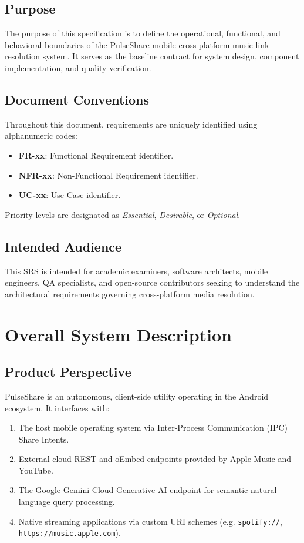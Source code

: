 \documentclass[12pt,a4paper]{report}
\begin{document}
\subsection{Purpose}
The purpose of this specification is to define the operational, functional, and behavioral boundaries of the PulseShare mobile cross-platform music link resolution system. It serves as the baseline contract for system design, component implementation, and quality verification.

\subsection{Document Conventions}
Throughout this document, requirements are uniquely identified using alphanumeric codes:
\begin{itemize}
    \item \textbf{FR-xx}: Functional Requirement identifier.
    \item \textbf{NFR-xx}: Non-Functional Requirement identifier.
    \item \textbf{UC-xx}: Use Case identifier.
\end{itemize}
Priority levels are designated as \textit{Essential}, \textit{Desirable}, or \textit{Optional}.

\subsection{Intended Audience}
This SRS is intended for academic examiners, software architects, mobile engineers, QA specialists, and open-source contributors seeking to understand the architectural requirements governing cross-platform media resolution.

\section{Overall System Description}

\subsection{Product Perspective}
PulseShare is an autonomous, client-side utility operating in the Android ecosystem. It interfaces with:
\begin{enumerate}
    \item The host mobile operating system via Inter-Process Communication (IPC) Share Intents.
    \item External cloud REST and oEmbed endpoints provided by Apple Music and YouTube.
    \item The Google Gemini Cloud Generative AI endpoint for semantic natural language query processing.
    \item Native streaming applications via custom URI schemes (e.g. \texttt{spotify://}, \texttt{https://music.apple.com}).
\end{enumerate}
\end{document}
